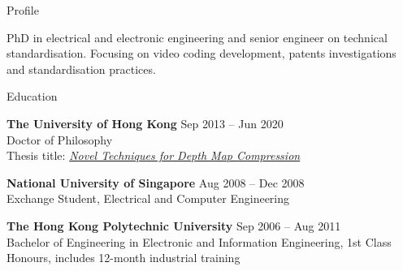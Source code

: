 \documentclass{resume} %
\begin{document}

\begin{rSection}{Profile}

PhD in electrical and electronic engineering and senior engineer on technical standardisation. Focusing on video coding development, patents investigations and standardisation practices.

\end{rSection}


\begin{rSection}{Education}

{\bf The University of Hong Kong} \hfill {Sep 2013 -- Jun 2020} \\ 
Doctor of Philosophy \\
Thesis title: \href{http://hdl.handle.net/10722/318421}{\textit{Novel Techniques for Depth Map Compression}}

{\bf National University of Singapore} \hfill {Aug 2008 -- Dec 2008} \\ 
Exchange Student, Electrical and Computer Engineering

{\bf The Hong Kong Polytechnic University} \hfill {Sep 2006 -- Aug 2011} \\ 
Bachelor of Engineering in Electronic and Information Engineering, 1st Class Honours, includes 12-month industrial training

\end{rSection}

\end{document}
